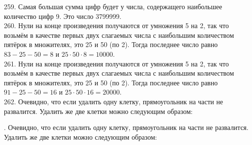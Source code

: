 \documentclass[12pt]{article}
\begin{document}
259. Самая большая сумма цифр будет у числа, содержащего наибольшее количество цифр 9. Это число 3799999.\\
260. Нули на конце произведения получаются от умножения 5 на 2, так что возьмём в качестве первых двух слагаемых числа с наибольшим количеством пятёрок в множителях, это 25 и 50 (по 2). Тогда последнее число равно $83-25-50=8$ и $25\cdot50\cdot8=10000.$\\
261. Нули на конце произведения получаются от умножения 5 на 2, так что возьмём в качестве первых двух слагаемых числа с наибольшим количеством пятёрок в множителях, это 25 и 50 (по 2). Тогда последнее число равно $91-25-50=16$ и $25\cdot50\cdot16=20000.$\\
262. Очевидно, что если удалить одну клетку, прямоугольник на части не развалится. Удалить же две клетки можно следующим образом:
\begin{center}
\begin{figure}[ht!]
\end{figure}
\end{center}
\newpage{}. Очевидно, что если удалить одну клетку, прямоугольник на части не развалится. Удалить же две клетки можно следующим образом:
\begin{center}
\begin{figure}[ht!]
\end{figure}
\end{center}
\end{document}
